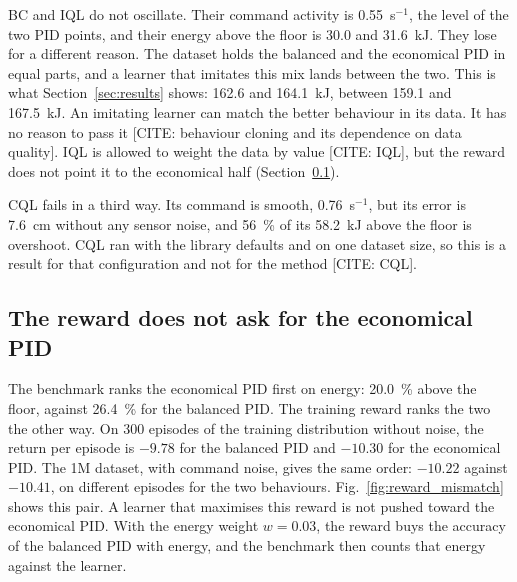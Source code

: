 BC and IQL do not oscillate. Their command activity is 0.55~s$^{-1}$, the level
of the two PID points, and their energy above the floor is 30.0 and 31.6~kJ. %
They lose for a different reason. The dataset holds the balanced and the
economical PID in equal parts, and a learner that imitates this mix lands
between the two. This is what Section~\ref{sec:results} shows: 162.6 and 164.1~kJ, between
159.1 and 167.5~kJ. %
An imitating learner can match the better behaviour in its data. It has no
reason to pass it [CITE: behaviour cloning and its dependence on data quality].
IQL is allowed to weight the data by value [CITE: IQL], but the reward does not
point it to the economical half (Section~\ref{sec:reward}).

CQL fails in a third way. Its command is smooth, 0.76~s$^{-1}$, but its error
is 7.6~cm without any sensor noise, and 56~\% of its 58.2~kJ above the floor is
overshoot. %
CQL ran with the library defaults and on one dataset size, so this is a result
for that configuration and not for the method [CITE: CQL]. %

\subsection{The reward does not ask for the economical PID}
\label{sec:reward}

The benchmark ranks the economical PID first on energy: 20.0~\% above the
floor, against 26.4~\% for the balanced PID. %
The training reward ranks the two the other way. On 300 episodes of the
training distribution without noise, the return per episode is $-9.78$ for the
balanced PID and $-10.30$ for the economical PID. %
The 1M dataset, with command noise, gives the same order: $-10.22$ against
$-10.41$, on different episodes for the two behaviours. %
Fig.~\ref{fig:reward_mismatch} shows this pair. A learner that maximises this
reward is not pushed toward the economical PID. With the energy weight
$w = 0.03$, the reward buys the accuracy of the balanced PID with energy, and
the benchmark then counts that energy against the learner.

